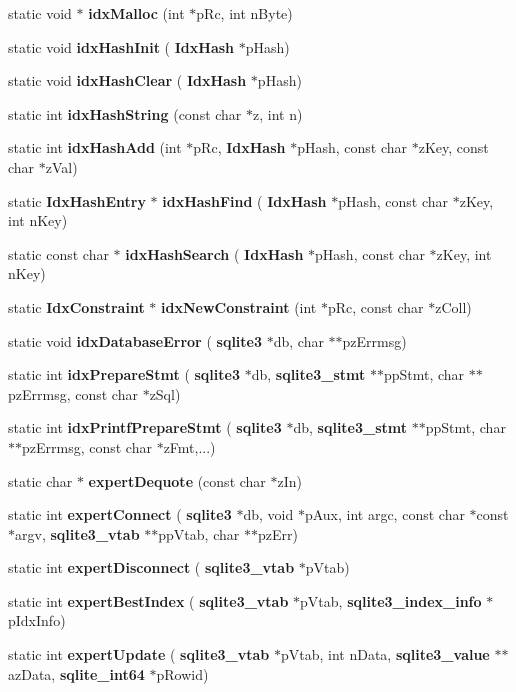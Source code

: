 \begin{DoxyCompactItemize}
static void $\ast$ \textbf{ idx\+Malloc} (int $\ast$p\+Rc, int n\+Byte)
\item 
static void \textbf{ idx\+Hash\+Init} (\textbf{ Idx\+Hash} $\ast$p\+Hash)
\item 
static void \textbf{ idx\+Hash\+Clear} (\textbf{ Idx\+Hash} $\ast$p\+Hash)
\item 
static int \textbf{ idx\+Hash\+String} (const char $\ast$z, int n)
\item 
static int \textbf{ idx\+Hash\+Add} (int $\ast$p\+Rc, \textbf{ Idx\+Hash} $\ast$p\+Hash, const char $\ast$z\+Key, const char $\ast$z\+Val)
\item 
static \textbf{ Idx\+Hash\+Entry} $\ast$ \textbf{ idx\+Hash\+Find} (\textbf{ Idx\+Hash} $\ast$p\+Hash, const char $\ast$z\+Key, int n\+Key)
\item 
static const char $\ast$ \textbf{ idx\+Hash\+Search} (\textbf{ Idx\+Hash} $\ast$p\+Hash, const char $\ast$z\+Key, int n\+Key)
\item 
static \textbf{ Idx\+Constraint} $\ast$ \textbf{ idx\+New\+Constraint} (int $\ast$p\+Rc, const char $\ast$z\+Coll)
\item 
static void \textbf{ idx\+Database\+Error} (\textbf{ sqlite3} $\ast$db, char $\ast$$\ast$pz\+Errmsg)
\item 
static int \textbf{ idx\+Prepare\+Stmt} (\textbf{ sqlite3} $\ast$db, \textbf{ sqlite3\+\_\+stmt} $\ast$$\ast$pp\+Stmt, char $\ast$$\ast$pz\+Errmsg, const char $\ast$z\+Sql)
\item 
static int \textbf{ idx\+Printf\+Prepare\+Stmt} (\textbf{ sqlite3} $\ast$db, \textbf{ sqlite3\+\_\+stmt} $\ast$$\ast$pp\+Stmt, char $\ast$$\ast$pz\+Errmsg, const char $\ast$z\+Fmt,...)
\item 
static char $\ast$ \textbf{ expert\+Dequote} (const char $\ast$z\+In)
\item 
static int \textbf{ expert\+Connect} (\textbf{ sqlite3} $\ast$db, void $\ast$p\+Aux, int argc, const char $\ast$const $\ast$argv, \textbf{ sqlite3\+\_\+vtab} $\ast$$\ast$pp\+Vtab, char $\ast$$\ast$pz\+Err)
\item 
static int \textbf{ expert\+Disconnect} (\textbf{ sqlite3\+\_\+vtab} $\ast$p\+Vtab)
\item 
static int \textbf{ expert\+Best\+Index} (\textbf{ sqlite3\+\_\+vtab} $\ast$p\+Vtab, \textbf{ sqlite3\+\_\+index\+\_\+info} $\ast$p\+Idx\+Info)
\item 
static int \textbf{ expert\+Update} (\textbf{ sqlite3\+\_\+vtab} $\ast$p\+Vtab, int n\+Data, \textbf{ sqlite3\+\_\+value} $\ast$$\ast$az\+Data, \textbf{ sqlite\+\_\+int64} $\ast$p\+Rowid)

\end{DoxyCompactItemize}
